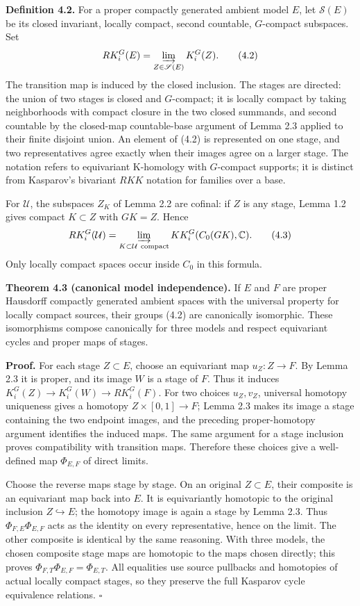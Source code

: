 \documentclass[
  11pt,
]{article}
\begin{document}
\textbf{Definition 4.2.} For a proper compactly generated ambient model
\(E\), let \(\mathscr S(E)\) be its closed invariant, locally compact,
second countable, \(G\)-compact subspaces. Set \[
                 RK_i^G(E)=\varinjlim_{Z\in\mathscr S(E)}K_i^G(Z).
 \tag{4.2}
\] The transition map is induced by the closed inclusion. The stages are
directed: the union of two stages is closed and \(G\)-compact; it is
locally compact by taking neighborhoods with compact closure in the two
closed summands, and second countable by the closed-map countable-base
argument of Lemma 2.3 applied to their finite disjoint union. An element
of (4.2) is represented on one stage, and two representatives agree
exactly when their images agree on a larger stage. The notation refers
to equivariant K-homology with \(G\)-compact supports; it is distinct
from Kasparov's bivariant \(RKK\) notation for families over a base.

For \(\mathcal U\), the subspaces \(Z_K\) of Lemma 2.2 are cofinal: if
\(Z\) is any stage, Lemma 1.2 gives compact \(K\subset Z\) with
\(GK=Z\). Hence \[
        RK_i^G(\mathcal U)=\varinjlim_{K\subset\mathcal U\ \mathrm{compact}}
                            KK_i^G(C_0(GK),\mathbb C).
 \tag{4.3}
\] Only locally compact spaces occur inside \(C_0\) in this formula.

\textbf{Theorem 4.3 (canonical model independence).} If \(E\) and \(F\)
are proper Hausdorff compactly generated ambient spaces with the
universal property for locally compact sources, their groups (4.2) are
canonically isomorphic. These isomorphisms compose canonically for three
models and respect equivariant cycles and proper maps of stages.

\textbf{Proof.} For each stage \(Z\subset E\), choose an equivariant map
\(u_Z:Z\to F\). By Lemma 2.3 it is proper, and its image \(W\) is a
stage of \(F\). Thus it induces \(K_i^G(Z)\to K_i^G(W)\to RK_i^G(F)\).
For two choices \(u_Z,v_Z\), universal homotopy uniqueness gives a
homotopy \(Z\times[0,1]\to F\); Lemma 2.3 makes its image a stage
containing the two endpoint images, and the preceding proper-homotopy
argument identifies the induced maps. The same argument for a stage
inclusion proves compatibility with transition maps. Therefore these
choices give a well-defined map \(\Phi_{E,F}\) of direct limits.

Choose the reverse maps stage by stage. On an original \(Z\subset E\),
their composite is an equivariant map back into \(E\). It is
equivariantly homotopic to the original inclusion
\(Z\hookrightarrow E\); the homotopy image is again a stage by Lemma
2.3. Thus \(\Phi_{F,E}\Phi_{E,F}\) acts as the identity on every
representative, hence on the limit. The other composite is identical by
the same reasoning. With three models, the chosen composite stage maps
are homotopic to the maps chosen directly; this proves
\(\Phi_{F,T}\Phi_{E,F}=\Phi_{E,T}\). All equalities use source pullbacks
and homotopies of actual locally compact stages, so they preserve the
full Kasparov cycle equivalence relations. \(\square\)
\end{document}
